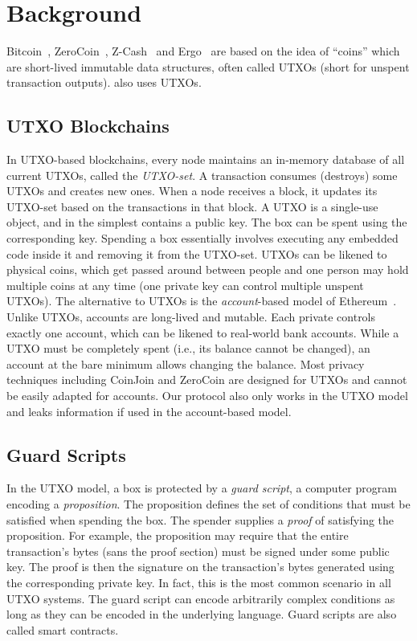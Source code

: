 \documentclass[11pt]{article}
\begin{document}
\section{Background}


Bitcoin~\cite{Nak08}, ZeroCoin~\cite{zerocoin}, Z-Cash~\cite{zcash} and Ergo~\cite{ergo} are based on the idea of ``coins'' which are short-lived immutable data structures, often called UTXOs (short for {unspent transaction outputs}). \algname also uses UTXOs. 

\subsection{UTXO Blockchains}
In UTXO-based blockchains, every node maintains an in-memory database of all current UTXOs, called the {\em UTXO-set}. A transaction consumes (destroys) some UTXOs and creates new ones. When a node receives a block, it updates its UTXO-set based on the transactions in that block. A UTXO is a single-use object, and in the simplest contains a public key. The box can be spent using the corresponding key. Spending a box essentially involves executing any embedded code inside it and removing it from the UTXO-set. UTXOs can be likened to physical coins, which get passed around between people and one person may hold multiple coins at any time (one private key can control multiple unspent UTXOs). 
The alternative to UTXOs is the {\em account}-based model of Ethereum~\cite{wood2014ethereum}. Unlike UTXOs, accounts are long-lived and mutable. Each private controls exactly one account, which can be likened to real-world bank accounts. While a UTXO must be completely spent (i.e., its balance cannot be changed), an account at the bare minimum allows changing the balance. Most privacy techniques including CoinJoin and ZeroCoin are designed for UTXOs and cannot be easily adapted for accounts. Our protocol also only works in the UTXO model and leaks information if used in the account-based model. 

\subsection{Guard Scripts}
In the UTXO model, a box is protected by a {\em guard script}, a computer program encoding a {\em proposition}. The proposition defines the set of conditions that must be satisfied when spending the box. The spender supplies a {\em proof} of satisfying the proposition. For example, the proposition may require that the entire transaction's bytes (sans the proof section) must be signed under some public key. The proof is then the signature on the transaction's bytes generated using the corresponding private key. In fact, this is the most common scenario in all UTXO systems. 
The guard script can encode arbitrarily complex conditions as long as they can be encoded in the underlying language. 
Guard scripts are also called smart contracts. 
\end{document}
